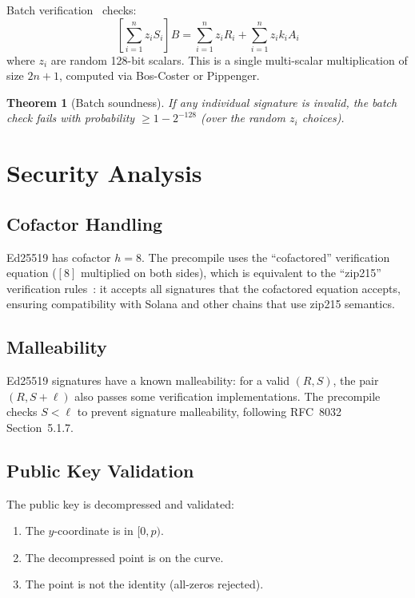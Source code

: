 \documentclass[11pt,a4paper]{article}
\newtheorem{theorem}{Theorem}
\begin{document}
Batch verification~\cite{batch-ed25519} checks:
\[
  \left[\sum_{i=1}^{n} z_i S_i\right] B = \sum_{i=1}^{n} z_i R_i + \sum_{i=1}^{n} z_i k_i A_i
\]
where $z_i$ are random 128-bit scalars. This is a single multi-scalar multiplication
of size $2n + 1$, computed via Bos-Coster or Pippenger.

\begin{theorem}[Batch soundness]
If any individual signature is invalid, the batch check fails with probability
$\geq 1 - 2^{-128}$ (over the random $z_i$ choices).
\end{theorem}

\section{Security Analysis}

\subsection{Cofactor Handling}

Ed25519 has cofactor $h = 8$. The precompile uses the ``cofactored'' verification
equation ($[8]$ multiplied on both sides), which is equivalent to the
``zip215'' verification rules~\cite{zip215}: it accepts all signatures that
the cofactored equation accepts, ensuring compatibility with Solana and
other chains that use zip215 semantics.

\subsection{Malleability}

Ed25519 signatures have a known malleability: for a valid $(R, S)$, the pair
$(R, S + \ell)$ also passes some verification implementations. The precompile
checks $S < \ell$ to prevent signature malleability, following RFC~8032
Section~5.1.7.

\subsection{Public Key Validation}

The public key is decompressed and validated:
\begin{enumerate}
  \item The $y$-coordinate is in $[0, p)$.
  \item The decompressed point is on the curve.
  \item The point is not the identity (all-zeros rejected).
\end{enumerate}
\end{document}
